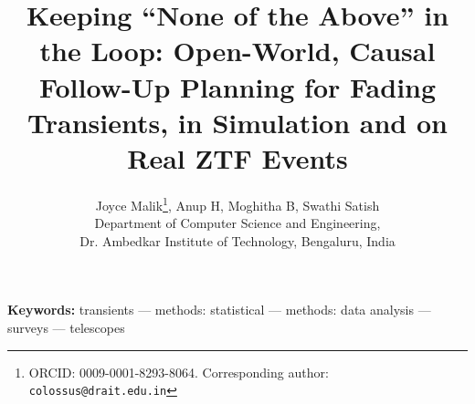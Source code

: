 \documentclass[12pt]{article}
\title{Keeping ``None of the Above'' in the Loop: Open-World, Causal Follow-Up Planning for Fading Transients, in Simulation and on Real ZTF Events}
\author{Joyce Malik\thanks{ORCID: 0009-0001-8293-8064. Corresponding author: \texttt{colossus@drait.edu.in}}, Anup H, Moghitha B, Swathi Satish\\[2pt]
\small Department of Computer Science and Engineering,\\ \small Dr. Ambedkar Institute of Technology, Bengaluru, India}
\date{}
\begin{document}
\maketitle



\noindent\textbf{Keywords:} transients --- methods: statistical --- methods: data analysis --- surveys --- telescopes
\end{document}
